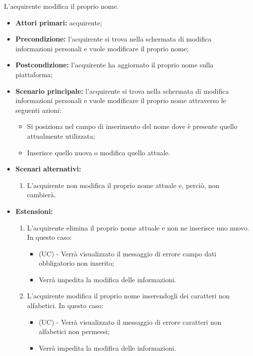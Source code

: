 L'acquirente modifica il proprio nome.
\begin{itemize}
    \item \textbf{Attori primari:} acquirente;
    \item \textbf{Precondizione:} l'acquirente si trova nella schermata di modifica informazioni personali e vuole modificare il proprio nome;
    \item \textbf{Postcondizione:} l'acquirente ha aggiornato il proprio nome sulla piattaforma;
    \item \textbf{Scenario principale:} l'acquirente si trova nella schermata di modifica informazioni personali e vuole modificare il proprio nome attraverso le seguenti azioni:
        \begin{itemize}
            \item Si posiziona nel campo di inserimento del nome dove è presente quello attualmente utilizzata;
            \item Inserisce quello nuova o modifica quello attuale.
        \end{itemize}
    \item \textbf{Scenari alternativi:} 
    \begin{enumerate}[label=\lett]
        \item L'acquirente non modifica il proprio nome attuale e, perciò, non cambierà.
    \end{enumerate}
    \item \textbf{Estensioni:} 
    \begin{enumerate}[label=\lett]
        \item L'acquirente elimina il proprio nome attuale e non ne inserisce uno nuovo. In questo caso:
        \begin{itemize}
            \item (UC) - Verrà visualizzato il messaggio di errore campo dati obbligatorio non inserito;
            \item Verrà impedita la modifica delle informazioni.
        \end{itemize}
        \item L'acquirente modifica il proprio nome inserendogli dei caratteri non alfabetici. In questo caso:
        \begin{itemize}
            \item (UC) - Verrà visualizzato il messaggio di errore caratteri non alfabetici non permessi;
            \item Verrà impedita la modifica delle informazioni.
        \end{itemize}
    \end{enumerate}
\end{itemize}

